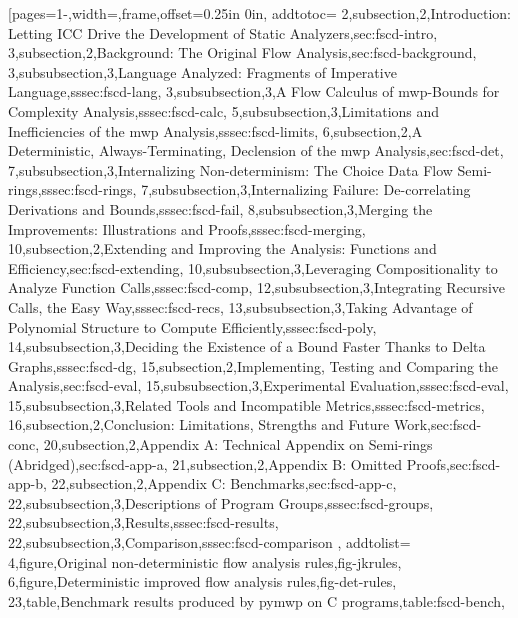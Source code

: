 [pages={1-},width={\textwidth},frame,offset=0.25in 0in,%
addtotoc={
    2,subsection,2,{Introduction: Letting ICC Drive the Development of Static \mbox{Analyzers}},sec:fscd-intro,
    3,subsection,2,{Background: The Original Flow Analysis},sec:fscd-background,
    3,subsubsection,3,{Language Analyzed: Fragments of Imperative Language},sssec:fscd-lang,
    3,subsubsection,3,{A Flow Calculus of mwp-Bounds for Complexity Analysis},sssec:fscd-calc,
    5,subsubsection,3,{Limitations and Inefficiencies of the mwp Analysis},sssec:fscd-limits,
    6,subsection,2,{A Deterministic, Always-Terminating, Declension of the mwp Analysis},sec:fscd-det,
    7,subsubsection,3,{Internalizing Non-determinism: The Choice Data Flow Semi-rings},sssec:fscd-rings,
    7,subsubsection,3,{Internalizing Failure: De-correlating Derivations and Bounds},sssec:fscd-fail,
    8,subsubsection,3,{Merging the Improvements: Illustrations and Proofs},sssec:fscd-merging,
    10,subsection,2,{Extending and Improving the Analysis: Functions and Efficiency},sec:fscd-extending,
    10,subsubsection,3,{Leveraging Compositionality to Analyze Function Calls},sssec:fscd-comp,
    12,subsubsection,3,{Integrating Recursive Calls, the Easy Way},sssec:fscd-recs,
    13,subsubsection,3,{Taking Advantage of Polynomial Structure to Compute Efficiently},sssec:fscd-poly,
    14,subsubsection,3,{Deciding the Existence of a Bound Faster Thanks to Delta Graphs},sssec:fscd-dg,
    15,subsection,2,{Implementing, Testing and Comparing the Analysis},sec:fscd-eval,
    15,subsubsection,3,{Experimental Evaluation},sssec:fscd-eval,
    15,subsubsection,3,{Related Tools and Incompatible Metrics},sssec:fscd-metrics,
    16,subsection,2,{Conclusion: Limitations, Strengths and Future Work},sec:fscd-conc,
    20,subsection,2,{Appendix A: Technical Appendix on Semi-rings (Abridged)},sec:fscd-app-a,
    21,subsection,2,{Appendix B: Omitted Proofs},sec:fscd-app-b,
    22,subsection,2,{Appendix C: Benchmarks},sec:fscd-app-c,
    22,subsubsection,3,{Descriptions of Program Groups},sssec:fscd-groups,
    22,subsubsection,3,{Results},sssec:fscd-results,
    22,subsubsection,3,{Comparison},sssec:fscd-comparison
}, addtolist={
    4,figure,{Original non-deterministic flow analysis rules},fig-jkrules,
    6,figure,{Deterministic improved flow analysis rules},fig-det-rules,
    23,table,{Benchmark results produced by pymwp on C programs},table:fscd-bench},
